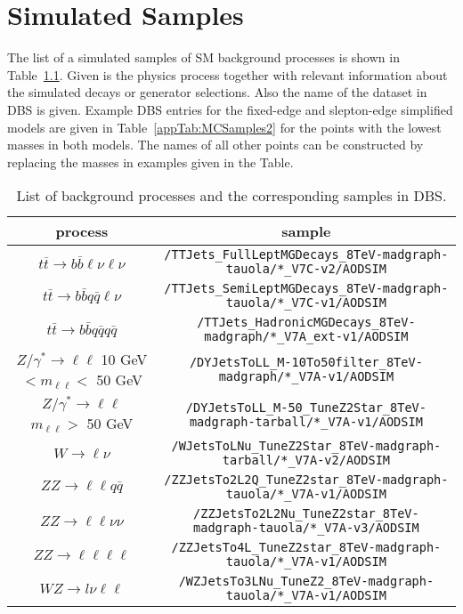 \chapter{Simulated Samples}
The list of a simulated samples of SM background processes is shown in Table~\ref{appTab:MCSamples}. Given is the physics process together with relevant information about the simulated decays or generator selections. Also the name of the dataset in DBS is given. Example DBS entries for the fixed-edge and slepton-edge simplified models are given in Table~\ref{appTab:MCSamples2} for the points with the lowest masses in both models. The names of all other points can be constructed by replacing the masses in examples given in the Table. 





\begin{table}[htb] 
\scriptsize
\caption{List of background processes and the corresponding samples in DBS.}
\label{appTab:MCSamples}
\begin{tabular}{c|c}
 process & sample \\
\hline 
$t\bar{t} \rightarrow b\bar{b}\ell\nu \ell\nu$ & \verb+/TTJets_FullLeptMGDecays_8TeV-madgraph-tauola/*_V7C-v2/AODSIM+ \\
$t\bar{t} \rightarrow b\bar{b}q\bar{q}\ell\nu$ & \verb+/TTJets_SemiLeptMGDecays_8TeV-madgraph-tauola/*_V7C-v1/AODSIM+ \\
$t\bar{t} \rightarrow b\bar{b}q\bar{q}q\bar{q}$ & \verb+/TTJets_HadronicMGDecays_8TeV-madgraph/*_V7A_ext-v1/AODSIM+ \\
\hline 
$Z/\gamma^{*} \rightarrow \ell\ell$ 10 GeV $< m_{\ell\ell} <$ 50 GeV & \verb+/DYJetsToLL_M-10To50filter_8TeV-madgraph/*_V7A-v1/AODSIM+ \\
$Z/\gamma^{*} \rightarrow \ell\ell$ $m_{\ell\ell} >$ 50 GeV & \verb+/DYJetsToLL_M-50_TuneZ2Star_8TeV-madgraph-tarball/*_V7A-v1/AODSIM+ \\
\hline 
$W \rightarrow \ell\nu$ & \verb+/WJetsToLNu_TuneZ2Star_8TeV-madgraph-tarball/*_V7A-v2/AODSIM+ \\
\hline 
$ZZ \rightarrow \ell\ell q\bar{q}$ & \verb+/ZZJetsTo2L2Q_TuneZ2star_8TeV-madgraph-tauola/*_V7A-v1/AODSIM+ \\
$ZZ \rightarrow \ell\ell\nu\nu$ & \verb+/ZZJetsTo2L2Nu_TuneZ2star_8TeV-madgraph-tauola/*_V7A-v3/AODSIM+ \\
$ZZ \rightarrow \ell\ell\ell\ell$ & \verb+/ZZJetsTo4L_TuneZ2star_8TeV-madgraph-tauola/*_V7A-v1/AODSIM+ \\
$WZ \rightarrow l\nu \ell\ell$ & \verb+/WZJetsTo3LNu_TuneZ2_8TeV-madgraph-tauola/*_V7A-v1/AODSIM+ \\

\end{tabular}
\end{table}
